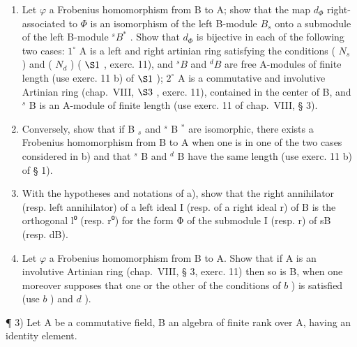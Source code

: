 \begin{enumerate}
\def\labelenumi{\alph{enumi})}
\setcounter{enumi}{1}
\item
  Let \(\varphi\) a Frobenius homomorphism from B to A; show that the map \(d_{\Phi}\) right-associated to \(\Phi\) is an isomorphism of the left B-module \(B_s\) onto a submodule of the left B-module \(^sB^*\) . Show that \(d_{\Phi}\) is bijective in each of the following two cases: \(1^\circ\) A is a left and right artinian ring satisfying the conditions ( \(N_s\) ) and ( \(N_d\) ) ( \(\S 1\) , exerc. 11), and \(^sB\) and \(^dB\) are free A-modules of finite length (use exerc. 11 b) of \(\S 1\) ); \(2^\circ\) A is a commutative and involutive Artinian ring (chap.~VIII, \(\S 3\) , exerc. 11), contained in the center of B, and \(^{s}\) B is an A-module of finite length (use exerc. 11 of chap.~VIII, § 3).
\item
  Conversely, show that if B \(_{s}\) and \(^{s}\) B \(^{*}\) are isomorphic, there exists a Frobenius homomorphism from B to A when one is in one of the two cases considered in b) and that \(^{s}\) B and \(^{d}\) B have the same length (use exerc. 11 b) of § 1).
\item
  With the hypotheses and notations of a), show that the right annihilator (resp. left annihilator) of a left ideal I (resp. of a right ideal r) of B is the orthogonal l⁰ (resp. r⁰) for the form Φ of the submodule I (resp. r) of sB (resp. dB).
\item
  Let \(\varphi\) a Frobenius homomorphism from B to A. Show that if A is an involutive Artinian ring (chap.~VIII, § 3, exerc. 11) then so is B, when one moreover supposes that one or the other of the conditions of \(b\) ) is satisfied (use \(b\) ) and \(d\) ).
\end{enumerate}

¶ 3) Let A be a commutative field, B an algebra of finite rank over A, having an identity element.

